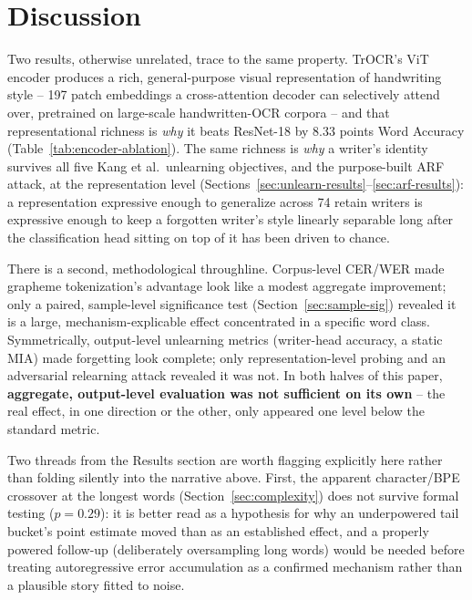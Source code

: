 \documentclass[a4paper,fleqn]{cas-dc}
\begin{document}
\section{Discussion}
\label{sec:discussion}

Two results, otherwise unrelated, trace to the same property. TrOCR's ViT
encoder produces a rich, general-purpose visual representation of
handwriting style -- 197 patch embeddings a cross-attention decoder can
selectively attend over, pretrained on large-scale handwritten-OCR corpora
-- and that representational richness is \emph{why} it beats ResNet-18 by
8.33 points Word Accuracy (Table~\ref{tab:encoder-ablation}). The same
richness is \emph{why} a writer's identity survives all five Kang et
al.\ unlearning objectives, and the purpose-built ARF attack, at the
representation level (Sections~\ref{sec:unlearn-results}--\ref{sec:arf-results}):
a representation expressive enough to generalize across 74 retain writers
is expressive enough to keep a forgotten writer's style linearly separable
long after the classification head sitting on top of it has been driven to
chance.

There is a second, methodological throughline. Corpus-level CER/WER made
grapheme tokenization's advantage look like a modest aggregate improvement;
only a paired, sample-level significance test (Section~\ref{sec:sample-sig})
revealed it is a large, mechanism-explicable effect concentrated in a
specific word class. Symmetrically, output-level unlearning metrics
(writer-head accuracy, a static MIA) made forgetting look complete; only
representation-level probing and an adversarial relearning attack revealed
it was not. In both halves of this paper, \textbf{aggregate, output-level
evaluation was not sufficient on its own} -- the real effect, in one
direction or the other, only appeared one level below the standard metric.

Two threads from the Results section are worth flagging explicitly here
rather than folding silently into the narrative above. First, the
apparent character/BPE crossover at the longest words
(Section~\ref{sec:complexity}) does not survive formal testing
($p=0.29$): it is better read as a hypothesis for why an underpowered
tail bucket's point estimate moved than as an established effect, and a
properly powered follow-up (deliberately oversampling long words) would
be needed before treating autoregressive error accumulation as a
confirmed mechanism rather than a plausible story fitted to noise.
\end{document}
